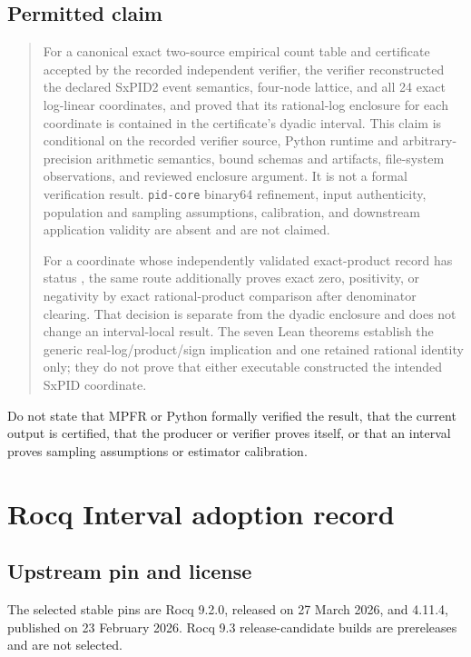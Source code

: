 \documentclass[11pt]{article}
\begin{document}
\subsection{Permitted claim}

\begin{quote}
For a canonical exact two-source empirical count table and certificate accepted by the recorded
independent verifier, the verifier reconstructed the declared SxPID2 event semantics, four-node
lattice, and all 24 exact log-linear coordinates, and proved that its rational-log enclosure for
each coordinate is contained in the certificate's dyadic interval.  This claim is conditional on
the recorded verifier source, Python runtime and arbitrary-precision arithmetic semantics, bound
schemas and artifacts, file-system observations, and reviewed enclosure argument.  It is not a
formal verification result.  \texttt{pid-core} binary64 refinement, input authenticity, population
and sampling assumptions, calibration, and downstream application validity are absent and are not
claimed.

For a coordinate whose independently validated exact-product record has status ,
the same route additionally proves exact zero, positivity, or negativity by exact rational-product
comparison after denominator clearing.  That decision is separate from the dyadic enclosure and
does not change an interval-local  result.  The seven Lean theorems establish
the generic real-log/product/sign implication and one retained rational identity only; they do not
prove that either executable constructed the intended SxPID coordinate.
\end{quote}

Do not state that MPFR or Python formally verified the result, that the current  output
is certified, that the producer or verifier proves itself, or that an interval proves sampling
assumptions or estimator calibration.

\section{Rocq Interval adoption record}

\subsection{Upstream pin and license}

The selected stable pins are Rocq 9.2.0, released on 27 March 2026, and
 4.11.4, published on 23 February 2026.  Rocq 9.3 release-candidate builds are
prereleases and are not selected.
\end{document}
